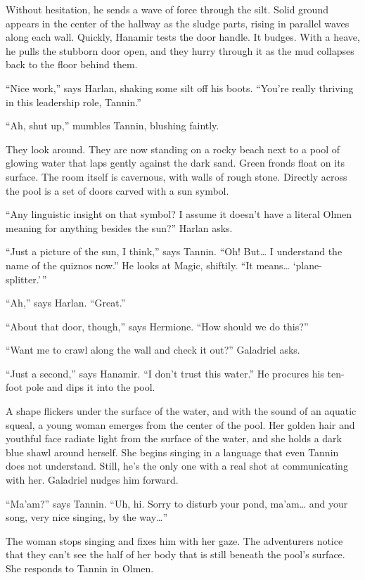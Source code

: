 \documentclass[smalldemyvopaper,11pt,twoside,onecolumn,openright,extrafontsizes]{memoir}
\begin{document}
Without hesitation, he sends a wave of force through the silt. Solid
ground appears in the center of the hallway as the sludge parts, rising
in parallel waves along each wall. Quickly, Hanamir tests the door
handle. It budges. With a heave, he pulls the stubborn door open, and
they hurry through it as the mud collapses back to the floor behind
them.

``Nice work,'' says Harlan, shaking some silt off his boots. ``You're
really thriving in this leadership role, Tannin.''

``Ah, shut up,'' mumbles Tannin, blushing faintly.

They look around. They are now standing on a rocky beach next to a pool
of glowing water that laps gently against the dark sand. Green fronds
float on its surface. The room itself is cavernous, with walls of rough
stone. Directly across the pool is a set of doors carved with a sun
symbol.

``Any linguistic insight on that symbol? I assume it doesn't have a
literal Olmen meaning for anything besides the sun?'' Harlan asks.

``Just a picture of the sun, I think,'' says Tannin. ``Oh! But\ldots{} I
understand the name of the quiznos now.'' He looks at Magic, shiftily.
``It means\ldots{} `plane-splitter.'\,''

``Ah,'' says Harlan. ``Great.''

``About that door, though,'' says Hermione. ``How should we do this?''

``Want me to crawl along the wall and check it out?'' Galadriel asks.

``Just a second,'' says Hanamir. ``I don't trust this water.'' He
procures his ten-foot pole and dips it into the pool.

A shape flickers under the surface of the water, and with the sound of
an aquatic squeal, a young woman emerges from the center of the pool.
Her golden hair and youthful face radiate light from the surface of the
water, and she holds a dark blue shawl around herself. She begins
singing in a language that even Tannin does not understand. Still, he's
the only one with a real shot at communicating with her. Galadriel
nudges him forward.

``Ma'am?'' says Tannin. ``Uh, hi. Sorry to disturb your pond,
ma'am\ldots{} and your song, very nice singing, by the way\ldots{}''

The woman stops singing and fixes him with her gaze. The adventurers
notice that they can't see the half of her body that is still beneath
the pool's surface. She responds to Tannin in Olmen.
\end{document}
